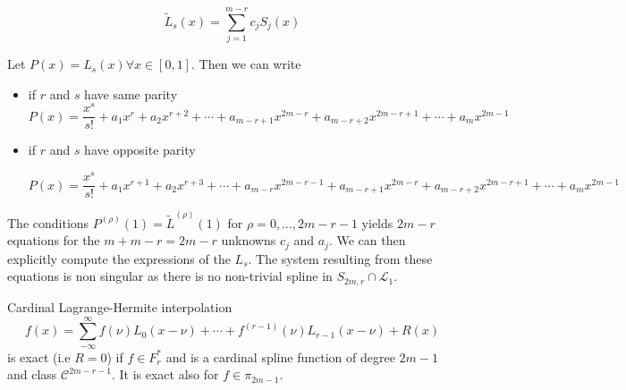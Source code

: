 \documentclass[a4paper, 11pt]{article}
\begin{document}
\begin{equation}
  \tilde{L}_s(x) = \sum_{j=1}^{m-r} c_j S_j(x)
\end{equation}

Let $P(x) = L_s(x) \forall x \in [0,1]$. Then we can write
\begin{itemize}
  \item{if $r$ and $s$ have same parity} 
    \begin{equation}P(x) = \frac{x^s}{s!} + a_1 x^r + a_2 x^{r+2} + \cdots + a_{m-r+1} x^{2m-r} + a_{m-r+2} x^{2m-r+1} + 
      \cdots + a_{m} x^{2m-1}
    \end{equation} 
  \item{if $r$ and $s$ have opposite parity} 
    
    \begin{equation}P(x) = \frac{x^s}{s!} + a_1 x^{r+1} + a_2 x^{r+3} + \cdots + a_{m-r} x^{2m-r-1} + a_{m-r+1} x^{2m-r}  
      + a_{m-r+2} x^{2m-r+1} + \cdots + a_{m} x^{2m-1}
    \end{equation}
\end{itemize}

The conditions $P^{(\rho)}(1) = \tilde{L}^{(\rho)}(1)$ for $\rho = 0, \ldots, 2m-r-1$ yields $2m-r$ equations for the 
$m+m-r = 2m-r$ unknowns $c_j$ and $a_j$. We can then explicitly compute the expressions of the $L_s$. The system 
resulting from these equations is non singular as there is no non-trivial spline in $S_{2m,r} \cap \mathcal{L}_{1}$.

\begin{cor}{Cardinal Lagrange-Hermite interpolation}
  \begin{equation}
    f(x) = \sum_{-\infty}^{\infty} f(\nu) L_0(x-\nu) + \cdots + f^{(r-1)}(\nu) L_{r-1}(x-\nu) + R(x)
  \end{equation}
  is exact (i.e $R=0$) if $f \in F^{*}_{r}$ and is a cardinal spline function of degree $2m-1$ and class 
  $\mathcal{C}^{2m-r-1}$. It is exact also for $f \in \pi_{2m-1}$.  
\end{cor}
\end{document}
